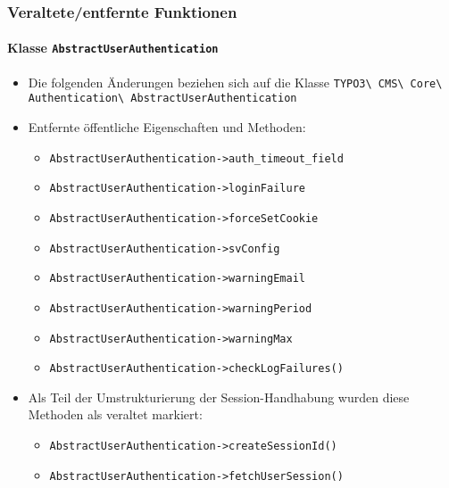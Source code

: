 %

\begin{frame}[fragile]
	\frametitle{Veraltete/entfernte Funktionen}
	\framesubtitle{Klasse \texttt{AbstractUserAuthentication}}

	\begin{itemize}
		\item Die folgenden Änderungen beziehen sich auf die Klasse\newline
			\small\texttt{TYPO3\textbackslash
				CMS\textbackslash
				Core\textbackslash
				Authentication\textbackslash
				AbstractUserAuthentication}\normalsize

		\item Entfernte öffentliche Eigenschaften und Methoden:

			\begin{itemize}\smaller
				\item \texttt{AbstractUserAuthentication->auth\_timeout\_field}
				\item \texttt{AbstractUserAuthentication->loginFailure}
				\item \texttt{AbstractUserAuthentication->forceSetCookie}
				\item \texttt{AbstractUserAuthentication->svConfig}
				\item \texttt{AbstractUserAuthentication->warningEmail}
				\item \texttt{AbstractUserAuthentication->warningPeriod}
				\item \texttt{AbstractUserAuthentication->warningMax}
				\item \texttt{AbstractUserAuthentication->checkLogFailures()}
			\end{itemize}\normalsize

		\item Als Teil der Umstrukturierung der Session-Handhabung wurden diese Methoden als veraltet markiert:

			\begin{itemize}\smaller
				\item \texttt{AbstractUserAuthentication->createSessionId()}
				\item \texttt{AbstractUserAuthentication->fetchUserSession()}
			\end{itemize}\normalsize


	\end{itemize}

\end{frame}

